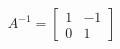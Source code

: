 \documentclass[preview]{standalone}
\begin{document}
\begin{align*}
A^{-1}=\begin{bmatrix}1&-1\\0&1\end{bmatrix}
\end{align*}
\end{document}
